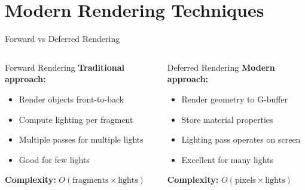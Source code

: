 \section{Modern Rendering Techniques}

\begin{frame}{Forward vs Deferred Rendering}
  \begin{columns}
    \begin{column}{0.5\textwidth}
      \begin{raybox}{Forward Rendering}
        \textbf{Traditional approach:}
        \begin{itemize}
          \item Render objects front-to-back
          \item Compute lighting per fragment
          \item Multiple passes for multiple lights
          \item Good for few lights
        \end{itemize}

        \vspace{0.3cm}
        \textbf{Complexity:} $O(\text{fragments} \times \text{lights})$
      \end{raybox}
    \end{column}
    \begin{column}{0.5\textwidth}
      \begin{conceptbox}{Deferred Rendering}
        \textbf{Modern approach:}
        \begin{itemize}
          \item Render geometry to G-buffer
          \item Store material properties
          \item Lighting pass operates on screen
          \item Excellent for many lights
        \end{itemize}

        \vspace{0.3cm}
        \textbf{Complexity:} $O(\text{pixels} \times \text{lights})$
      \end{conceptbox}
    \end{column}
  \end{columns}

  \pause
  \begin{center}
\end{center}
\end{frame}
